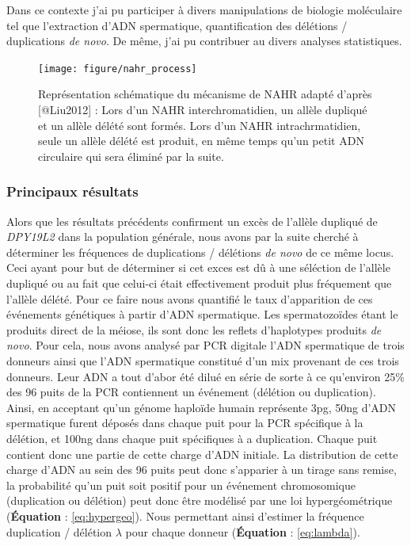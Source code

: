 \documentclass[12pt,twoside]{reedthesis}
\theoremstyle{definition}
\theoremstyle{definition}
\theoremstyle{remark}
\begin{document}
  Dans ce contexte j'ai pu participer à divers manipulations de biologie
  moléculaire tel que l'extraction d'ADN spermatique, quantification des
  délétions / duplications \emph{de novo}. De même, j'ai pu contribuer au
  divers analyses statistiques.
  
  \newpage 
  
  \begin{figure}
  
  {\centering \texttt{[image: figure/nahr\_process]} 
  
  }
  
  \caption[Représentation schématique du mécanisme de NAHR]{Représentation schématique du mécanisme de NAHR adapté d'après [@Liu2012] : Lors d'un NAHR interchromatidien, un allèle dupliqué et un allèle délété sont formés. Lors d'un NAHR intrachrmatidien, seule un allèle délété est produit, en même temps qu'un petit ADN circulaire qui sera éliminé par la suite.}\label{fig:nahr}
  \end{figure}
  
  \newpage
  
  
  
  \newpage
  
  \subsubsection{Principaux résultats}\label{principaux-resultats}
  
  Alors que les résultats précédents confirment un excès de l'allèle
  dupliqué de \emph{DPY19L2} dans la population générale, nous avons par
  la suite cherché à déterminer les fréquences de duplications / délétions
  \emph{de novo} de ce même locus. Ceci ayant pour but de déterminer si
  cet exces est dû à une séléction de l'allèle dupliqué ou au fait que
  celui-ci était effectivement produit plus fréquement que l'allèle
  délété. Pour ce faire nous avons quantifié le taux d'apparition de ces
  événements génétiques à partir d'ADN spermatique. Les spermatozoïdes
  étant le produits direct de la méiose, ils sont donc les reflets
  d'haplotypes produits \emph{de novo}. Pour cela, nous avons analysé par
  PCR digitale l'ADN spermatique de trois donneurs ainsi que l'ADN
  spermatique constitué d'un mix provenant de ces trois donneurs. Leur ADN
  a tout d'abor été dilué en série de sorte à ce qu'environ 25\% des 96
  puits de la PCR contiennent un événement (délétion ou duplication).
  Ainsi, en acceptant qu'un génome haploïde humain représente 3pg, 50ng
  d'ADN spermatique furent déposés dans chaque puit pour la PCR spécifique
  à la délétion, et 100ng dans chaque puit spécifiques à a duplication.
  Chaque puit contient donc une partie de cette charge d'ADN initiale. La
  distribution de cette charge d'ADN au sein des 96 puits peut donc
  s'apparier à un tirage sans remise, la probabilité qu'un puit soit
  positif pour un événement chromosomique (duplication ou délétion) peut
  donc être modélisé par une loi hypergéométrique (\textbf{Équation} :
  \eqref{eq:hypergeo}). Nous permettant ainsi d'estimer la fréquence
  duplication / délétion \(\lambda\) pour chaque donneur
  (\textbf{Équation} : \eqref{eq:lambda}).\\
  
\end{document}
